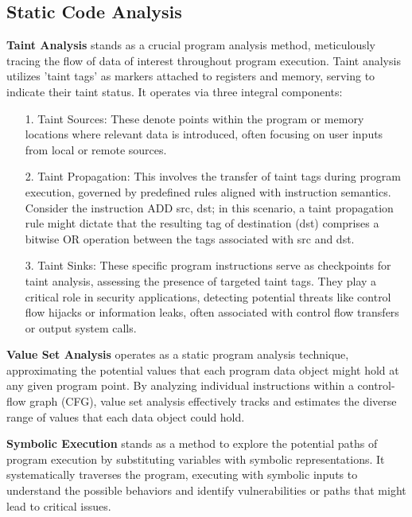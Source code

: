 \subsection{Static Code Analysis}

\textbf{Taint Analysis} stands as a crucial program analysis method, meticulously tracing the flow of data of interest throughout program execution. Taint analysis utilizes 'taint tags' as markers attached to registers and memory, serving to indicate their taint status. It operates via three integral components:

\begin{enumerate}
  \item[1.] Taint Sources: These denote points within the program or memory locations where relevant data is introduced, often focusing on user inputs from local or remote sources.
  
  \item[2.] Taint Propagation: This involves the transfer of taint tags during program execution, governed by predefined rules aligned with instruction semantics. Consider the instruction ADD src, dst; in this scenario, a taint propagation rule might dictate that the resulting tag of destination (dst) comprises a bitwise OR operation between the tags associated with src and dst.
  
  \item[3.] Taint Sinks: These specific program instructions serve as checkpoints for taint analysis, assessing the presence of targeted taint tags. They play a critical role in security applications, detecting potential threats like control flow hijacks or information leaks, often associated with control flow transfers or output system calls.
  
\end{enumerate}

\textbf{Value Set Analysis} operates as a static program analysis technique, approximating the potential values that each program data object might hold at any given program point. By analyzing individual instructions within a control-flow graph (CFG), value set analysis effectively tracks and estimates the diverse range of values that each data object could hold. 

\textbf{Symbolic Execution} stands as a method to explore the potential paths of program execution by substituting variables with symbolic representations. It systematically traverses the program, executing with symbolic inputs to understand the possible behaviors and identify vulnerabilities or paths that might lead to critical issues.
